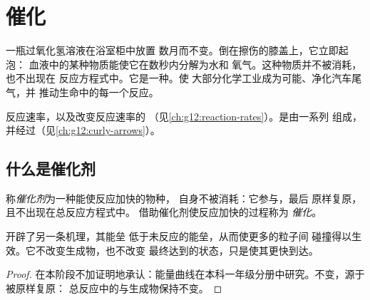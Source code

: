 \chapter{催化}\label{ch:g12:catalysis}

一瓶过氧化氢溶液在浴室柜中放置
数月而不变。倒在擦伤的膝盖上，它立即起泡：
血液中的某种物质能使它在数秒内分解为水和
氧气。这种物质并不被消耗，也不出现在
反应方程式中。它是一种。使
大部分化学工业成为可能、净化汽车尾气，并
推动生命中的每一个反应。

\begin{recall}
反应速率，以及改变反应速率的
（见\cref{ch:g12:reaction-rates}）。是由一系列
组成，并经过（见\cref{ch:g12:curly-arrows}）。
\end{recall}

\section{什么是催化剂}

\begin{definition}[催化剂，催化]\label{def:g12:catalysis:catalyst}
称\emph{催化剂}为一种能使反应加快的物种，
自身不被消耗：它参与，最后
原样复原，且不出现在总反应方程式中。
借助催化剂使反应加快的过程称为
\emph{催化}。
\end{definition}

\begin{proposition}\label{prop:g12:catalysis:path}
开辟了另一条机理，其能垒
低于未反应的能垒，从而使更多的粒子间
碰撞得以生效。它不改变生成物，也不改变
最终达到的状态，只是使其更快到达。
\end{proposition}

\begin{proof}
在本阶段不加证明地承认：能量曲线在本科一年级分册中研究。不变，源于被原样复原：
总反应中的与生成物保持不变。
\end{proof}

